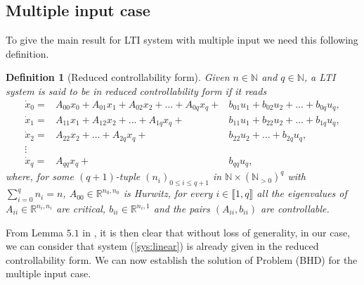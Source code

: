 \documentclass[letterpaper, 10pt]{article}
\newtheorem{defi}{Definition}
\newcommand{\rref}[1]{(\ref{#1})}
\newcommand{\reels}{\mathbb{R}}
\newcommand{\entiers}{\mathbb{N}}
\begin{document}
\subsection{Multiple input case}
To give the main result for LTI system with multiple input we need this following definition.
\begin{defi}[Reduced controllability form]
Given $n \in \entiers$ and $q \in \entiers$, a LTI system is said to be in \emph{reduced controllability form} if it reads
\begin{equation}
\label{lin:sys:mi}
\begin{array}{rrr}
\dot{x}_0     =  &  A_{00} x_0  +   A_{01}x_1 +  A_{02}x_2 + \ldots +  A_{0q} x_{q} +  & b_{01} u_1 +  b_{02} u_2 + \ldots +  b_{0q} u_{q} ,  \\
\dot{x}_1     =  &                  A_{11}x_1 +  A_{12}x_2 +  \ldots +  A_{1q} x_{q} + & b_{11} u_1 +  b_{22} u_2 + \ldots +  b_{1q} u_{q}  ,  \\
\dot{x}_2     =  &                               A_{22}x_2 +  \ldots +  A_{2q} x_{q} + &               b_{22} u_2 + \ldots +  b_{2q} u_{q} ,  \\
         \vdots  &                                                                                     &                                                          \\
\dot{x}_{q}  = &                                         A_{qq}x_{q}  + &                          b_{qq}u_{q},  
  \end{array}
\end{equation} where, for some $(q+1)$-tuple $(n_i)_{0\leq i \leq q+1}$ in $\entiers \times (\entiers_{>0})^q$ with $\sum_{i=0}^{q} n_i = n$, $A_{00} \in \reels^{n_0 , n_0}$ is Hurwitz, for every $i \in \llbracket 1, q \rrbracket$ all the eigenvalues of $A_{ii} \in \reels^{n_i , n_i}$ are critical, $b_{ii} \in \reels^{n_i,1}$ and the pairs $(A_{ii}, b_{ii})$ are controllable. 
\end{defi}
From Lemma $5.1$ in \cite{SSY}, it is then clear that without loss of generality, in our case, we can consider that system \rref{sys:linear}  is already given in the reduced controllability form. We can now establish the solution of Problem (BHD) for the multiple input case.
\end{document}
